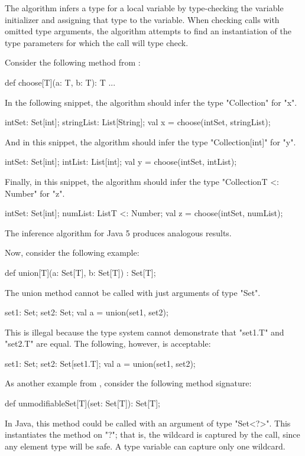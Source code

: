 \documentclass{llncs}
\begin{document}
The algorithm infers a type for a local variable by
type-checking the variable initializer and assigning
that type to the variable.
When checking calls with omitted type arguments,
the algorithm attempts to find an instantiation of the type
parameters for which the call will type check.
\fi

Consider the following method from \cite{adding-wildcards}:
\begin{xten}
def choose[T](a: T, b: T): T { ... }
\end{xten}
%
In the following snippet, the algorithm should infer the type
\xcd"Collection" for \xcd"x".
\begin{xten}
intSet: Set[int];
stringList: List[String];
val x = choose(intSet, stringList);
\end{xten}
%
And in this snippet, the algorithm should infer the type
\xcd"Collection[int]" for \xcd"y".
\begin{xten}
intSet: Set[int];
intList: List[int];
val y = choose(intSet, intList);
\end{xten}
%
Finally, in this snippet, the algorithm should infer the type
\xcd"Collection{T <: Number}" for \xcd"z".
\begin{xten}
intSet: Set[int];
numList: List{T <: Number};
val z = choose(intSet, numList);
\end{xten}
The inference algorithm for Java 5 produces analogous results.

Now, consider the following example:
\begin{xten}
def union[T](a: Set[T], b: Set[T]) : Set[T];
\end{xten}
The union method cannot be called with just arguments of type \xcd"Set".
\begin{xten}
set1: Set;
set2: Set;
val a = union(set1, set2);
\end{xten}
This is illegal because the type system cannot demonstrate that
\xcd"set1.T" and \xcd"set2.T" are equal.
The following, however, is acceptable:
\begin{xten}
set1: Set;
set2: Set[set1.T];
val a = union(set1, set2);
\end{xten}

As another example from \cite{adding-wildcards}, consider
the following method signature:
\begin{xten}
def unmodifiableSet[T](set: Set[T]): Set[T];
\end{xten}

In Java, this method could be called with an argument of
type \xcd"Set<?>".
This instantiates the method on \xcd"?"; that is, the
wildcard is captured by the call, since any element type will be
safe.  A type variable can capture only one wildcard.
\end{document}
